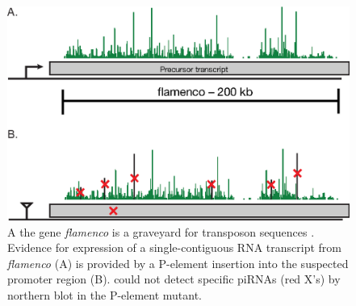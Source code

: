 {      \begin{figure} %
      \centering 
      \includegraphics{Figures/Intro/FlamencoLocus.eps}
      \caption[Genetic evidence for long, continuous fly piRNA precursor transcripts]
      {
        A the \flies{} gene \textit{flamenco} is a graveyard for transposon sequences \citep{Pelisson1994}. Evidence for expression of a single-contiguous RNA transcript from \textit{flamenco} (A) is provided by a P-element insertion into the suspected promoter region (B). \citep{Brennecke2007} could not detect specific piRNAs (red X's) by northern blot in the P-element mutant.
        }
      \label{Intro:fig:flamenco}
      \end{figure}

}
